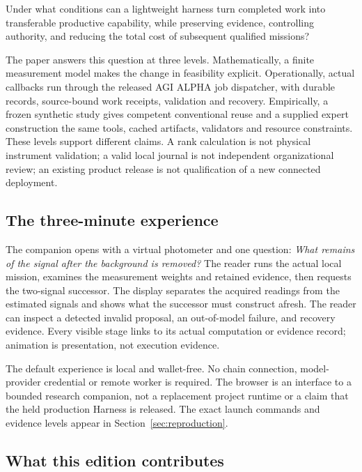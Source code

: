 \documentclass[11pt]{article}
\begin{document}
\begin{insight}[title={The research question}]
Under what conditions can a lightweight harness turn completed work into transferable productive capability, while preserving evidence, controlling authority, and reducing the total cost of subsequent qualified missions?
\end{insight}

The paper answers this question at three levels. Mathematically, a finite measurement model makes the change in feasibility explicit. Operationally, actual callbacks run through the released AGI ALPHA job dispatcher, with durable records, source-bound work receipts, validation and recovery. Empirically, a frozen synthetic study gives competent conventional reuse and a supplied expert construction the same tools, cached artifacts, validators and resource constraints. These levels support different claims. A rank calculation is not physical instrument validation; a valid local journal is not independent organizational review; an existing product release is not qualification of a new connected deployment.

\subsection{The three-minute experience}

The companion opens with a virtual photometer and one question: \emph{What remains of the signal after the background is removed?} The reader runs the actual local mission, examines the measurement weights and retained evidence, then requests the two-signal successor. The display separates the acquired readings from the estimated signals and shows what the successor must construct afresh. The reader can inspect a detected invalid proposal, an out-of-model failure, and recovery evidence. Every visible stage links to its actual computation or evidence record; animation is presentation, not execution evidence.

The default experience is local and wallet-free. No chain connection, model-provider credential or remote worker is required. The browser is an interface to a bounded research companion, not a replacement project runtime or a claim that the held production Harness is released. The exact launch commands and evidence levels appear in Section~\ref{sec:reproduction}.

\subsection{What this edition contributes}
\end{document}
